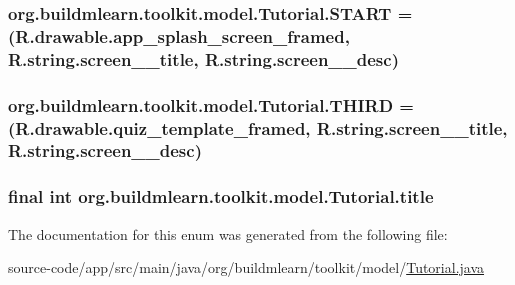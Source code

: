 \subsubsection[{\texorpdfstring{S\+T\+A\+RT}{START}}]{\setlength{\rightskip}{0pt plus 5cm}org.\+buildmlearn.\+toolkit.\+model.\+Tutorial.\+S\+T\+A\+RT =(R.\+drawable.\+app\+\_\+splash\+\_\+screen\+\_\+framed, R.\+string.\+screen\+\_\+\_\+title, R.\+string.\+screen\+\_\+\_\+desc)}\hypertarget{enumorg_1_1buildmlearn_1_1toolkit_1_1model_1_1Tutorial_a6c371c9b15a236ef851b34eb9b0ffefe}{}\label{enumorg_1_1buildmlearn_1_1toolkit_1_1model_1_1Tutorial_a6c371c9b15a236ef851b34eb9b0ffefe}
\subsubsection[{\texorpdfstring{T\+H\+I\+RD}{THIRD}}]{\setlength{\rightskip}{0pt plus 5cm}org.\+buildmlearn.\+toolkit.\+model.\+Tutorial.\+T\+H\+I\+RD =(R.\+drawable.\+quiz\+\_\+template\+\_\+framed, R.\+string.\+screen\+\_\+\_\+title, R.\+string.\+screen\+\_\+\_\+desc)}\hypertarget{enumorg_1_1buildmlearn_1_1toolkit_1_1model_1_1Tutorial_a9cc74bacb34a8d3a0c7fa0dbadfc0786}{}\label{enumorg_1_1buildmlearn_1_1toolkit_1_1model_1_1Tutorial_a9cc74bacb34a8d3a0c7fa0dbadfc0786}
\subsubsection[{\texorpdfstring{title}{title}}]{\setlength{\rightskip}{0pt plus 5cm}final int org.\+buildmlearn.\+toolkit.\+model.\+Tutorial.\+title\hspace{0.3cm}{\ttfamily [private]}}\hypertarget{enumorg_1_1buildmlearn_1_1toolkit_1_1model_1_1Tutorial_a6cd2b7c4e1b8b48f0d7eccdc13b57d09}{}\label{enumorg_1_1buildmlearn_1_1toolkit_1_1model_1_1Tutorial_a6cd2b7c4e1b8b48f0d7eccdc13b57d09}


The documentation for this enum was generated from the following file\+:\begin{DoxyCompactItemize}
\item 
source-\/code/app/src/main/java/org/buildmlearn/toolkit/model/\hyperlink{Tutorial_8java}{Tutorial.\+java}\end{DoxyCompactItemize}
